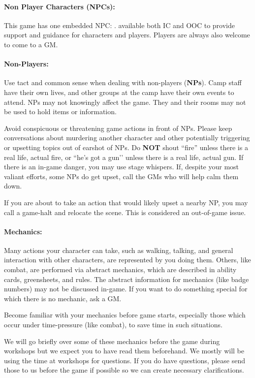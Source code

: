 \documentclass[sheet]{GL2020}
\begin{document}
\paragraph{Non Player Characters (NPCs):} This game has one embedded NPC: \cPrincipal{\intro}. \cPrincipal{\They} \cPrincipal{\are} available both IC and OOC to provide support and guidance for characters and players. Players are always also welcome to come to a GM.

\paragraph{Non-Players:} Use tact and common sense when dealing with non-players ({\bf NPs}). Camp staff have their own lives, and other groups at the camp have their own events to attend. NPs may not knowingly affect the game. They and their rooms may not be used to hold items or information.

Avoid conspicuous or threatening game actions in front of NPs. Please keep conversations about murdering another character and other potentially triggering or upsetting topics out of earshot of NPs. Do \textbf{NOT} shout ``fire'' unless there is a real life, actual fire, or ``he’s got a gun’’ unless there is a real life, actual gun. If there is an in-game danger, you may use stage whispers. If, despite your most valiant efforts, some NPs do get upset, call the GMs who will help calm them down.

If you are about to take an action that would likely upset a nearby NP, you may call a game-halt and relocate the scene. This is considered an out-of-game issue.

\paragraph{Mechanics:} Many actions your character can take, such as walking, talking, and general interaction with other characters, are represented by you doing them. Others, like combat, are performed via abstract mechanics, which are described in ability cards, greensheets, and rules. The abstract information for mechanics (like badge numbers) may not be discussed in-game. If you want to do something special for which there is no mechanic, ask a GM.

Become familiar with your mechanics before game starts, especially those which occur under time-pressure (like combat), to save time in such situations.

We will go briefly over some of these mechanics before the game during workshops but we expect you to have read them beforehand. We mostly will be using the time at workshops for questions. If you do have questions, please send those to us before the game if possible so we can create necessary clarifications.
\end{document}
